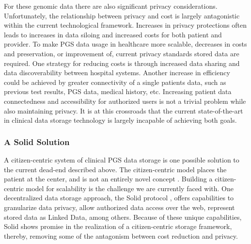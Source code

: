 \documentclass[runningheads]{llncs}
\begin{document}
For these genomic data there are also significant privacy considerations.
Unfortunately, the relationship between privacy and cost is largely antagonistic within the current technological framework.
Increases in privacy protections often leads to increases in data siloing and increased costs for both patient and provider.
To make PGS data usage in healthcare more scalable, decreases in costs and preservation, or improvement of, current privacy standards stored data are required.
One strategy for reducing costs is through increased data sharing and data discoverability between hospital systems.
Another increase in efficiency could be achieved by greater connectivity of a single patient\textquotesingle s data, such as previous test results, PGS data, medical history, etc.
Increasing patient data connectedness and accessibility for authorized users is not a trivial problem while also maintaining privacy.
It is at this crossroads that the current state-of-the-art in clinical data storage technology is largely incapable of achieving both goals.

\subsubsection{A Solid Solution} 
A citizen-centric system of clinical PGS data storage is one possible solution to the current dead-end described above. 
The citizen-centric model places the patient at the center, and is not an entirely novel concept \cite{brands_patient-centered_2022}.
Building a citizen-centric model for scalability is the challenge we are currently faced with.
One decentralized data storage approach, the Solid protocol \cite{capadisli_solid_nodate}, offers capabilities to granularize data privacy, allow authorized data access over the web, represent stored data as Linked Data, among others.
Because of these unique capabilities, Solid shows promise in the realization of a citizen-centric storage framework, thereby, removing some of the antagonism between cost reduction and privacy.

\end{document}

